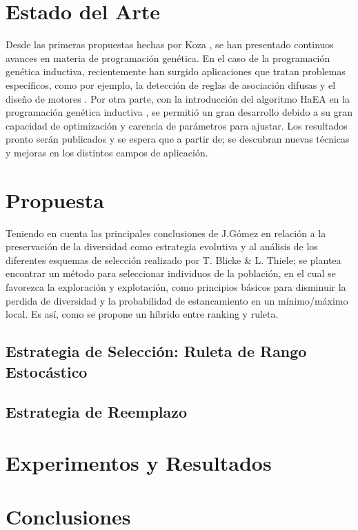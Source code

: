 \documentclass{llncs}
\begin{document}
\section{Estado del Arte}
Desde las primeras propuestas hechas por Koza \cite{koza}, se han presentado continuos avances \cite{koza:1} en materia de programación genética. En el caso de la programación genética inductiva, recientemente han surgido aplicaciones que tratan problemas específicos, como por ejemplo, la detección de reglas de asociación difusas \cite{gonz} y el diseño de motores \cite{karim}.
Por otra parte, con la introducción del algoritmo HaEA \cite{gomez} en la programación genética inductiva \cite{cub:gom:2}, se permitió un gran desarrollo debido a su gran capacidad de optimización y carencia de parámetros para ajustar. Los resultados pronto serán publicados y se espera que a partir de; se descubran nuevas técnicas y mejoras en los distintos campos de aplicación.

\section{Propuesta}
Teniendo en cuenta las principales conclusiones de J.Gómez \cite{gomez} en relación a la preservación de la diversidad como estrategia evolutiva y al análisis de los diferentes esquemas de selección realizado por T. Blicke \& L. Thiele\cite{blick:thiele}; se plantea encontrar un método para seleccionar individuos de la población, en el cual se favorezca la   exploración y explotación, como principios básicos para disminuir la perdida de diversidad y la probabilidad de estancamiento en un mínimo/máximo local. Es así, como se propone un híbrido entre ranking y ruleta.

\subsection{Estrategia de Selección: Ruleta de Rango Estocástico}



\subsection{Estrategia de Reemplazo}

\section{Experimentos y Resultados}


\section{Conclusiones}
\end{document}
